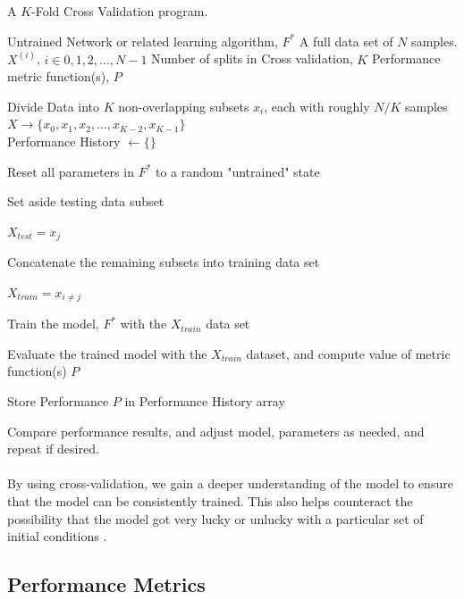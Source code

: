 \documentclass[12pt,letterpaper]{article}
\begin{document}
\begin{algorithm}[H]
\caption{A $K$-Fold Cross Validation program.}
\label{algFeedForward}

\begin{algorithmic}
\REQUIRE Untrained Network or related learning algorithm, $F^*$
\REQUIRE A full data set of $N$ samples. $X^{(i)}$, $i \in {0,1,2,...,N-1}$
\REQUIRE Number of splits in Cross validation, $K$
\REQUIRE Performance metric function(s), $P$

Divide Data into $K$ non-overlapping subsets $x_{i}$, each with roughly $N/K$ samples \\
$X \rightarrow \big\{ x_{0}, x_{1}, x_{2}, ..., x_{K-2},  x_{K-1} \big\}$ \\
Performance History $\leftarrow \{\}$

	\item Reset all parameters in $F^*$ to a random "untrained" state
	\item Set aside testing data subset
	\item $X_{test} = x_{j}$
	\item Concatenate the remaining subsets into training data set
	\item $X_{train} = x_{i \neq j}$
	\item Train the model, $F^*$ with the $X_{train}$ data set
	\item Evaluate the trained model with the $X_{train}$ dataset, and compute value of metric function(s) $P$
	\item Store Performance $P$ in Performance History array
\ENDFOR

Compare performance results, and adjust model, parameters as needed, and repeat if desired.

\end{algorithmic}
\end{algorithm}

\paragraph*{}By using cross-validation, we gain a deeper understanding of the model to ensure that the model can be consistently trained. This also helps counteract the possibility that the model got very lucky or unlucky with a particular set of initial conditions \cite{Geron,James}.


\subsection{Performance Metrics}
\end{document}

